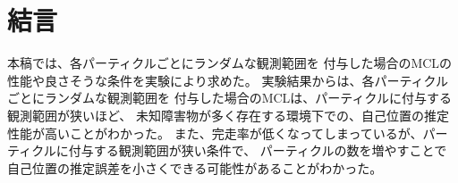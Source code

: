 \documentclass{jarticle}
\begin{document}



\section{結言}%

本稿では、各パーティクルごとにランダムな観測範囲を
付与した場合のMCLの性能や良さそうな条件を実験により求めた。
実験結果からは、各パーティクルごとにランダムな観測範囲を
付与した場合のMCLは、パーティクルに付与する観測範囲が狭いほど、
未知障害物が多く存在する環境下での、自己位置の推定性能が高いことがわかった。
また、完走率が低くなってしまっているが、パーティクルに付与する観測範囲が狭い条件で、
パーティクルの数を増やすことで自己位置の推定誤差を小さくできる可能性があることがわかった。
\end{document}
